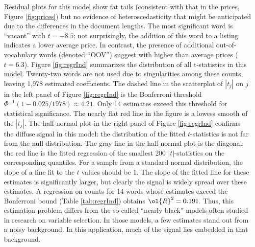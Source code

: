 \documentclass[10pt]{article}
\begin{document}
 Residual plots for this model show fat tails (consistent with that in the
 prices, Figure \ref{fig:prices}) but no evidence of heteroscedasticity
 that might be anticipated due to the differences in the document lengths.  The
 most significant word is ``vacant'' with $t=-8.5$; not surprisingly, the
 addition of this word to a listing indicates a lower average price.  In
 contrast, the presence of additional out-of-vocabulary words (denoted ``OOV'')
 suggest with higher than average prices ($t=6.3$). Figure \ref{fig:regrInd}
 summarizes the distribution of all t-statistics in this model.  Twenty-two
 words are not used due to singularities among these counts, leaving 1,978
 estimated coefficients.  The dashed line in the scatterplot of $|t_j|$ on $j$
 in the left panel of Figure \ref{fig:regrInd} is the Bonferroni threshold
 $\Phi^{-1}(1-0.025/1978) \approx 4.21$.  Only 14 estimates exceed this
 threshold for statistical significance.  The nearly flat red line in the figure
 is a lowess smooth of the $|t_j|$.  The half-normal plot in the right panel of
 Figure \ref{fig:regrInd} confirms the diffuse signal in this model: the
 distribution of the fitted $t$-statistics is not far from the null
 distribution.  The gray line in the half-normal plot is the diagonal; the red
 line is the fitted regression of the smallest 200 $|t|$-statistics on the
 corresponding quantiles.  For a sample from a standard normal distribution, the
 slope of a line fit to the $t$ values should be 1.  The slope of the fitted
 line for these estimates is significantly larger, but clearly the signal is
 widely spread over these estimates.  A regression on counts for 14 words whose
 estimates exceed the Bonferroni bound (Table \ref{tab:regrInd}) obtains
 $\ol{R}^2 = 0.191$.  Thus, this estimation problem differs from the so-called
 ``nearly black'' models often studied in research on variable selection.  In
 those models, a few estimates stand out from a noisy background. In this
 application, much of the signal lies embedded in that background.
\end{document}
